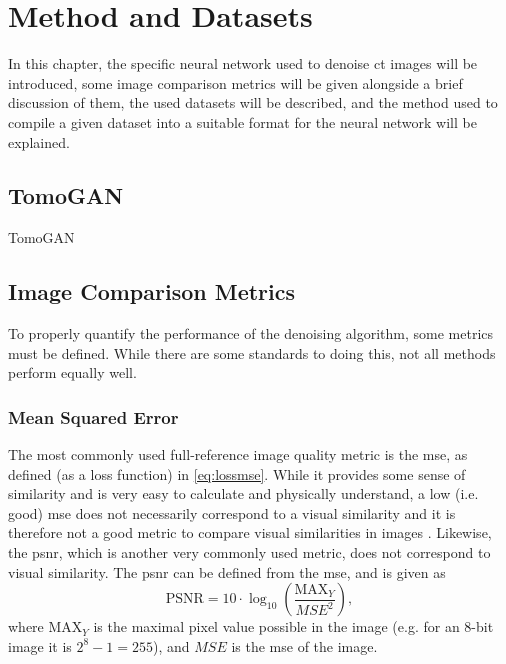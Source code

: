 \chapter{Method and Datasets}
\label{sec:method}
In this chapter, the specific neural network used to denoise \acrshort{ct} images will be introduced, some image comparison metrics will be given alongside a brief discussion of them, the used datasets will be described, and the method used to compile a given dataset into a suitable format for the neural network will be explained. 


\section{TomoGAN}
\label{sec:method:tomogan}
TomoGAN \cite{liu2020tomogan}


\section{Image Comparison Metrics}
\label{sec:method:metrics}
To properly quantify the performance of the denoising algorithm, some metrics must be defined. While there are some standards to doing this, not all methods perform equally well. 

\subsection{Mean Squared Error}
\label{sec:method:metrics:mse}
The most commonly used full-reference image quality metric is the \acrfull{mse}, as defined (as a loss function) in \cref{eq:lossmse}. While it provides some sense of similarity and is very easy to calculate and physically understand, a low (i.e. good) \acrshort{mse} does not necessarily correspond to a visual similarity and it is therefore not a good metric to compare visual similarities in images \cite{413502,477498}. Likewise, the \acrfull{psnr}, which is another very commonly used metric, does not correspond to visual similarity. The \acrshort{psnr} can be defined from the \acrshort{mse}, and is given as \cite{477498}
\begin{equation}
    \label{eq:psnr}
    \text{PSNR} = 10 \cdot \log_{10} \left( \frac{\text{MAX}_Y}{MSE^2} \right),
\end{equation}
where $\text{MAX}_Y$ is the maximal pixel value possible in the image (e.g. for an 8-bit image it is $2^8-1=255$), and $MSE$ is the \acrshort{mse} of the image. 

